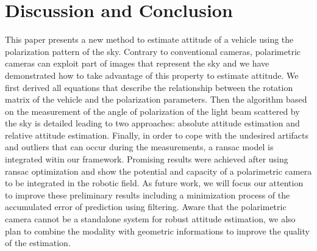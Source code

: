 \section{Discussion and Conclusion}
\label{sec:dis-con}

This paper presents a new method to estimate attitude of a vehicle using the polarization pattern of the sky.
Contrary to conventional cameras, polarimetric cameras can exploit part of images that represent the sky and 
we have demonstrated how to take advantage of this property to estimate attitude. We first derived all equations that 
describe the relationship between the rotation matrix of the vehicle and the polarization parameters. Then the algorithm
based on the measurement of the angle of polarization of the light beam scattered by the sky is detailed leading to two approaches: absolute attitude estimation and relative attitude estimation.
Finally, in order to cope with the undesired artifacts and outliers that can occur during the measurements, a ransac model is integrated witin our framework.
Promising results were achieved after using ransac optimization and show the potential and capacity of a polarimetric camera 
to be integrated in the robotic field.
As future work, we will focus our attention to improve these preliminary results including a minimization process of the
accumulated error of prediction using filtering. Aware that the polarimetric camera cannot be a standalone system for robust attitude estimation, 
we also plan to combine the modality with geometric informations to improve the quality of the estimation.



